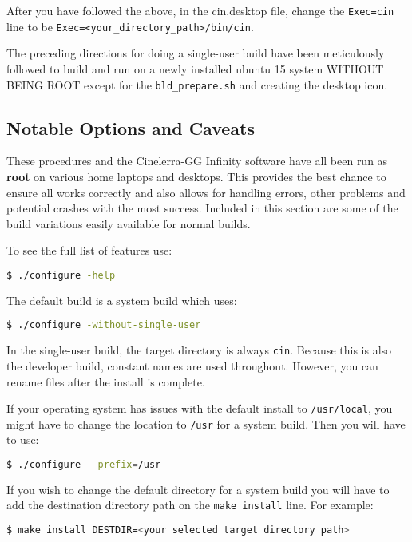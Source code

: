 After you have followed the above, in the cin.desktop file, change the \texttt{Exec=cin} line
to be \texttt{Exec=<your\_directory\_path>/bin/cin}.

The preceding directions for doing a single-user build have been meticulously followed to build and run
on a newly installed ubuntu 15 system WITHOUT BEING ROOT except for the \texttt{bld\_prepare.sh} and creating the desktop icon.

\subsection{Notable Options and Caveats}%
\label{sub:notable_options_and_caveats}

These procedures and the Cinelerra-GG Infinity software have all been run as \textbf{root} on various home laptops and desktops. This provides the best chance to ensure all works correctly and also allows for handling errors, other problems and potential crashes with the most success.  Included in this section are some of the build variations easily available for normal builds.

To see the full list of features use:	 

\begin{lstlisting}[language=bash,numbers=none]
$ ./configure -help
\end{lstlisting}
The default build is a system build which uses:    

\begin{lstlisting}[language=bash,numbers=none]
$ ./configure -without-single-user
\end{lstlisting}

In the single-user build, the target directory is always \texttt{cin}.  
Because this is also the developer build, constant names are used throughout.  
However, you can rename files after the install is complete.

If your operating system has issues with the default install to \texttt{/usr/local}, you might have to change the location to \texttt{/usr} for a system build.  Then you will have to use:
\begin{lstlisting}[language=bash,numbers=none]
$ ./configure --prefix=/usr
\end{lstlisting}

If you wish to change the default directory for a system build you will have to add the destination directory path on the \texttt{make install} line.  For example:
\begin{lstlisting}[language=bash,numbers=none]
$ make install DESTDIR=<your selected target directory path>
\end{lstlisting}

